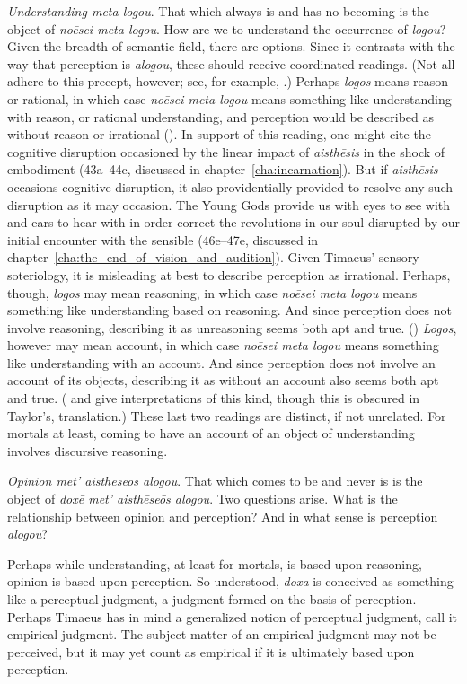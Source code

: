 \emph{Understanding \emph{meta logou}}. That which always is and has no becoming is the object of \emph{noēsei meta logou}. How are we to understand the occurrence of \emph{logou}? Given the breadth of semantic field, there are options. Since it contrasts with the way that perception is \emph{alogou}, these should receive coordinated readings. (Not all adhere to this precept, however; see, for example, \citealt[13]{Zeyl:2000cs}.) Perhaps \emph{logos} means reason or rational, in which case \emph{noēsei meta logou} means something like understanding with reason, or rational understanding, and perception would be described as without reason or irrational (\citealt[87]{Archer-Hind:1888qd}). In support of this reading, one might cite the cognitive disruption occasioned by the linear impact of \emph{aisthēsis} in the shock of embodiment (43a--44c, discussed in chapter~\ref{cha:incarnation}). But if \emph{aisthēsis} occasions cognitive disruption, it also providentially provided to resolve any such disruption as it may occasion. The Young Gods provide us with eyes to see with and ears to hear with in order correct the revolutions in our soul disrupted by our initial encounter with the sensible (46e--47e, discussed in chapter~\ref{cha:the_end_of_vision_and_audition}). Given Timaeus' sensory soteriology, it is misleading at best to describe perception as irrational. Perhaps, though, \emph{logos} may mean reasoning, in which case \emph{noēsei meta logou} means something like understanding based on reasoning. And since perception does not involve reasoning, describing it as unreasoning seems both apt and true. (\citealt{Bury:1929jb}) \emph{Logos}, however may mean account, in which case \emph{noēsei meta logou} means something like understanding with an account. And since perception does not involve an account of its objects, describing it as without an account also seems both apt and true. (\citealt[61]{Taylor:1928qb} and  \citealt{Cornford:1935fk} give interpretations of this kind, though this is obscured in Taylor's, \citeyear[25]{Taylor:1929ov} translation.) These last two readings are distinct, if not unrelated. For mortals at least, coming to have an account of an object of understanding involves discursive reasoning.

\emph{Opinion \emph{met' aisthēseōs alogou}}. That which comes to be and never is is the object of \emph{doxē met' aisthēseōs alogou}. Two questions arise. What is the relationship between opinion and perception? And in what sense is perception \emph{alogou}? 

Perhaps while understanding, at least for mortals, is based upon reasoning, opinion is based upon perception. So understood, \emph{doxa} is conceived as something like a perceptual judgment, a judgment formed on the basis of perception. Perhaps Timaeus has in mind a generalized notion of perceptual judgment, call it empirical judgment. The subject matter of an empirical judgment may not be perceived, but it may yet count as empirical if it is ultimately based upon perception. 


